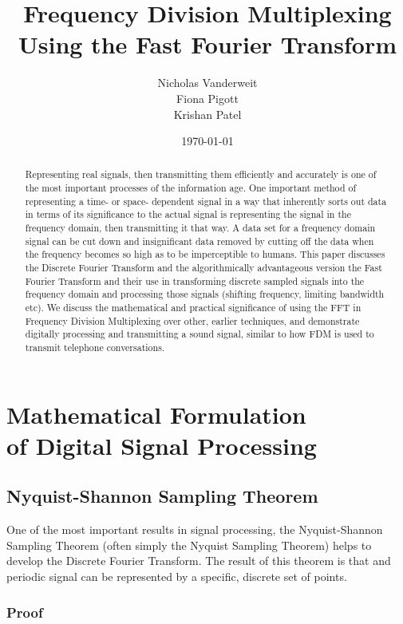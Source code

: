 \documentclass[12pt]{article}
\title{Frequency Division Multiplexing \\Using the Fast Fourier Transform }
\author{Nicholas Vanderweit \\Fiona Pigott \\Krishan Patel}
\date{\today}
\begin{document}
\maketitle


\begin{abstract}

Representing real signals, then transmitting them efficiently and accurately is one of the most important processes of the information age. One important method of representing a time- or space- dependent signal in a way that inherently sorts out data in terms of its significance to the actual signal is representing the signal in the frequency domain, then transmitting it that way. A data set for a frequency domain signal can be cut down and insignificant data removed by cutting off the data when the frequency becomes so high as to be imperceptible to humans.
This paper discusses the Discrete Fourier Transform and the algorithmically advantageous version the Fast Fourier Transform and their use in transforming discrete sampled signals into the frequency domain and processing those signals (shifting frequency, limiting bandwidth etc). We discuss the mathematical and practical significance of using the FFT in Frequency Division Multiplexing over other, earlier techniques, and demonstrate digitally processing and transmitting a sound signal, similar to how FDM is used to transmit telephone conversations.

\end{abstract}

\clearpage

\section{Mathematical Formulation \\of Digital Signal Processing}

\subsection{Nyquist-Shannon Sampling Theorem}

One of the most important results in signal processing, the Nyquist-Shannon Sampling Theorem (often simply the Nyquist Sampling Theorem) helps to develop the Discrete Fourier Transform. The result of this theorem is that and periodic signal can be represented by a specific, discrete set of points.

\subsubsection{Proof}
\end{document}
